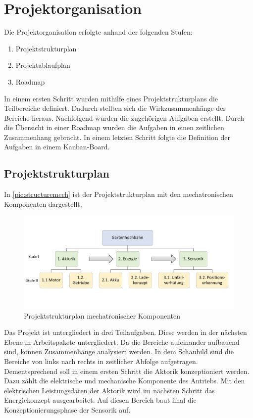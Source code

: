 \section{Projektorganisation}
\label{sec:projektorganisation}
Die Projektorganisation erfolgte anhand der folgenden Stufen: 

\begin{enumerate}
	\item Projektstrukturplan %
	\item Projektablaufplan 
	\item Roadmap
	
\end{enumerate}

In einem ersten Schritt wurden mithilfe eines Projektstrukturplans die Teilbereiche definiert. Dadurch stellten sich die Wirkzusammenhänge der Bereiche heraus. Nachfolgend wurden die zugehörigen Aufgaben erstellt. Durch die Übersicht in einer Roadmap wurden die Aufgaben in einen zeitlichen Zusammenhang gebracht. 
In einem letzten Schritt folgte die Definition der Aufgaben in einem Kanban-Board. 


\newpage
\subsection{Projektstrukturplan}
In \autoref{pic:structuremech} ist der  Projektstrukturplan mit den mechatronischen Komponenten dargestellt. 

\begin{figure}[h]
	\begin{center}
		\includegraphics[width=17cm]{projektstrukturplan.pdf}
		\caption{Projektstrukturplan mechatronischer Komponenten}
		\label{pic:structuremech}
	\end{center}
\end{figure}

Das Projekt ist untergliedert in drei Teilaufgaben. Diese werden in der nächsten Ebene in Arbeitspakete untergliedert. 
Da die Bereiche aufeinander aufbauend sind, können Zusammenhänge analysiert werden. In dem Schaubild sind die Bereiche von links nach rechts in zeitlicher Abfolge aufgetragen. Dementsprechend soll in einem ersten Schritt die Aktorik konzeptioniert werden. Dazu zählt die elektrische und mechanische Komponente des Antriebs. Mit den elektrischen Leistungsdaten der Aktorik wird im nächsten Schritt das Energiekonzept ausgearbeitet. Auf diesen Bereich baut final die Konzeptionierungsphase der Sensorik auf. \\ 

